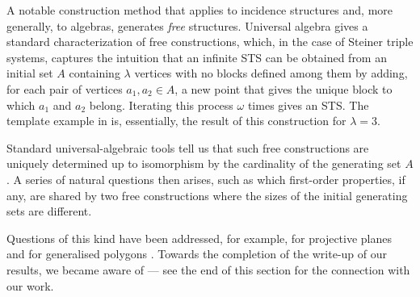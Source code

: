 \documentclass[a4paper, 11pt]{article}
\theoremstyle{note}
\begin{document}




A notable construction method that applies to incidence structures and, more generally, to algebras, generates \textit{free} structures.  Universal algebra gives a standard characterization of free constructions, which, in the case of Steiner triple systems, captures the intuition that an infinite STS can be obtained from an initial set $A$ containing $\lambda$ vertices with no blocks defined among them by adding, for each pair of vertices $a_1, a_2 \in A$, a new point that gives the unique block to which $a_1$ and $a_2$ belong. Iterating this process $\omega$ times gives an STS. The template example in \cite{chicotetal} is, essentially, the result of this construction for $\lambda=3$. 

Standard universal-algebraic tools tell us that such  free constructions are uniquely determined up to isomorphism by the cardinality of the generating set $A$. A series of natural questions then arises, such as which first-order properties, if any, are shared by two free constructions where the sizes of the initial generating sets are different.

Questions of this kind have been addressed, for example, for projective planes \cite{hyttpao} and for generalised polygons \cite{ammertent}. Towards the completion of the write-up of our results, we became aware of \cite{paoquad} --- see the end of this section for the connection with our work.
\end{document}
